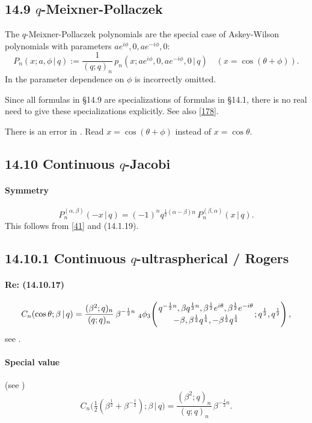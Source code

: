 \documentclass[twoside,11pt]{article}
\newcommand\al\alpha
\newcommand\be\beta
\newcommand\tha\theta
\newcommand\half{\frac12}
\newcommand\thalf{\tfrac12}
\newcommand{\qhyp}[5]{\,\mbox{}_{#1}\phi_{#2}\!\left(
  \genfrac{}{}{0pt}{}{#3}{#4};#5\right)}
\begin{document}
\subsection*{14.9 $q$-Meixner-Pollaczek}
\label{sec14.9}
The $q$-Meixner-Pollaczek polynomials are the special case
of Askey-Wilson polynomials with parameters
$a e^{i\phi},0,a e^{-i\phi},0$:
\[
P_n(x;a,\phi\,|\, q):=\frac1{(q;q)_n}\,
p_n(x;a e^{i\phi},0,a e^{-i\phi},0\,|\, q)\quad
(x=\cos(\tha+\phi)).
\]
In  the parameter dependence on $\phi$ is
incorrectly omitted.

Since all formulas in \S14.9 are specializations of formulas in \S14.1,
there is no real need to give these specializations explicitly.
See also \eqref{178}.

There is an error in .
Read $x=\cos(\tha+\phi)$ instead of $x=\cos\tha$.
%
\subsection*{14.10 Continuous $q$-Jacobi}
\label{sec14.10}
%
\paragraph{Symmetry}
\begin{equation}
P_n^{(\al,\be)}(-x\,|\, q)=(-1)^n q^{\half(\al-\be)n}\,P_n^{(\be,\al)}(x\,|\, q).
\label{110}
\end{equation}
This follows from \eqref{41} and (14.1.19).
%
\subsection*{14.10.1 Continuous $q$-ultraspherical / Rogers}
\label{sec14.10.1}
\paragraph{Re: (14.10.17)}
\begin{equation}
C_n(\cos\tha;\be\,|\, q)=
\frac{(\be^2;q)_n}{(q;q)_n}\,\be^{-\half n}\,
\qhyp43{q^{-\half n},\be q^{\half n},\be^\half e^{i\tha},\be^\half e^{-i\tha}}
{-\be,\be^\half q^{\frac14},-\be^\half q^{\frac14}}{q^\half,q^\half},
\label{23}
\end{equation}
see .
%
\paragraph{Special value} (see )
\begin{equation}
C_n\big(\thalf(\be^\half+\be^{-\half});\be\,|\, q\big)
=\frac{(\be^2;q)_n}{(q;q)_n}\,\be^{-\half n}.
\end{equation}
%
\end{document}
